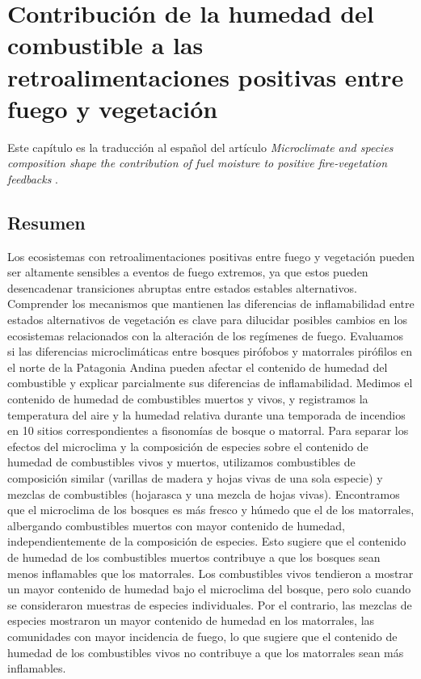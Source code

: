 \newpage{\ }
\cleardoublepage

\chapter[Capítulo 2. Contribución de la humedad del combustible a las retroalimentaciones positivas entre fuego y vegetación]{Contribución de la humedad del combustible a las retroalimentaciones positivas entre fuego y vegetación}\label{cap:palitos}

\noindent Este capítulo es la traducción al español del artículo \textit{Microclimate and species composition shape the contribution of fuel
moisture to positive fire-vegetation feedbacks} \citep{barbera_microclimate_2023}.

\section*{Resumen}

Los ecosistemas con retroalimentaciones positivas entre fuego y vegetación pueden ser altamente sensibles a eventos de fuego extremos, ya que estos pueden desencadenar transiciones abruptas entre estados estables alternativos. Comprender los mecanismos que mantienen las diferencias de inflamabilidad entre estados alternativos de vegetación es clave para dilucidar posibles cambios en los ecosistemas relacionados con la alteración de los regímenes de fuego. Evaluamos si las diferencias microclimáticas entre bosques pirófobos y matorrales pirófilos en el norte de la Patagonia Andina pueden afectar el contenido de humedad del combustible y explicar parcialmente sus diferencias de inflamabilidad. Medimos el contenido de humedad de combustibles muertos y vivos, y registramos la temperatura del aire y la humedad relativa durante una temporada de incendios en 10 sitios correspondientes a fisonomías de bosque o matorral. Para separar los efectos del microclima y la composición de especies sobre el contenido de humedad de combustibles vivos y muertos, utilizamos combustibles de composición similar (varillas de madera y hojas vivas de una sola especie) y mezclas de combustibles (hojarasca y una mezcla de hojas vivas). Encontramos que el microclima de los bosques es más fresco y húmedo que el de los matorrales, albergando combustibles muertos con mayor contenido de humedad, independientemente de la composición de especies. Esto sugiere que el contenido de humedad de los combustibles muertos contribuye a que los bosques sean menos inflamables que los matorrales. Los combustibles vivos tendieron a mostrar un mayor contenido de humedad bajo el microclima del bosque, pero solo cuando se consideraron muestras de especies individuales. Por el contrario, las mezclas de especies mostraron un mayor contenido de humedad en los matorrales, las comunidades con mayor incidencia de fuego, lo que sugiere que el contenido de humedad de los combustibles vivos no contribuye a que los matorrales sean más inflamables.

